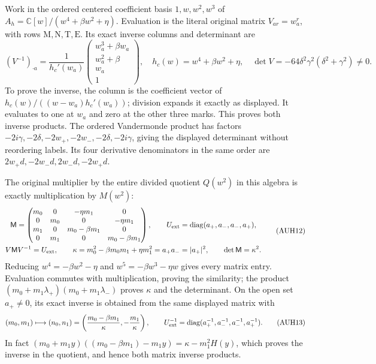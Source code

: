 Work in the ordered centered coefficient basis $1,w,w^2,w^3$ of
$A_h=\mathbb C[w]/(w^4+\beta w^2+\eta)$.
Evaluation is the literal original matrix $V_{ar}=w_a^r$, with
rows $\mathrm M,\mathrm N,\mathrm T,\mathrm E$.
Its exact inverse columns and determinant are
\[
 (V^{-1})_{\cdot a}
 =\frac1{h_c'(w_a)}
 \begin{pmatrix}w_a^3+\beta w_a\\w_a^2+\beta\\w_a\\1\end{pmatrix},
 \quad h_c(w)=w^4+\beta w^2+\eta,\quad
 \det V=-64\delta^2\gamma^2(\delta^2+\gamma^2)\ne0.
 \tag{AUH11}
\]
To prove the inverse, the column is the coefficient vector of
$h_c(w)/((w-w_a)h_c'(w_a))$; division expands it exactly as
displayed.  It evaluates to one at $w_a$ and zero at the other
three marks.  This proves both inverse products.
The ordered Vandermonde product has factors
$-2i\gamma,-2\delta,-2w_+,-2w_-,-2\delta,-2i\gamma$,
giving the displayed determinant without reordering labels.
Its four derivative denominators in the same order are
$2w_+d,-2w_-d,2w_-d,-2w_+d$.

The original multiplier by the entire divided quotient $Q(w^2)$
in this algebra is exactly multiplication by $M(w^2)$:
\[
\begin{gathered}
 \mathsf M=
 \begin{pmatrix}
 m_0&0&-\eta m_1&0\\
 0&m_0&0&-\eta m_1\\
 m_1&0&m_0-\beta m_1&0\\
 0&m_1&0&m_0-\beta m_1
 \end{pmatrix},\qquad
 U_{\rm ext}=\operatorname{diag}(a_+,a_-,a_-,a_+),\\
 V\mathsf M V^{-1}=U_{\rm ext},\qquad
 \kappa=m_0^2-\beta m_0m_1+\eta m_1^2=a_+a_-=|a_+|^2,
 \qquad\det\mathsf M=\kappa^2.
\end{gathered}\tag{AUH12}
\]
Reducing $w^4=-\beta w^2-\eta$ and
$w^5=-\beta w^3-\eta w$ gives every matrix entry.
Evaluation commutes with multiplication, proving the similarity;
the product $(m_0+m_1\lambda_+)(m_0+m_1\lambda_-)$ proves
$\kappa$ and the determinant.
On the open set $a_+\ne0$, its exact inverse is obtained from
the same displayed matrix with
\[
 (m_0,m_1)\longmapsto
 (n_0,n_1)=\left(\frac{m_0-\beta m_1}{\kappa},
                         -\frac{m_1}{\kappa}\right),\qquad
 U_{\rm ext}^{-1}=\operatorname{diag}(a_+^{-1},a_-^{-1},a_-^{-1},a_+^{-1}).
 \tag{AUH13}
\]
In fact
$(m_0+m_1y)((m_0-\beta m_1)-m_1y)=\kappa-m_1^2H(y)$,
which proves the inverse in the quotient, and hence both matrix
inverse products.

